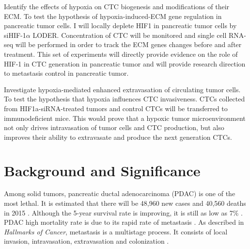 \documentclass[11pts]{article}
\begin{document}
Identify the effects of hypoxia on CTC biogenesis and modifications of their ECM. 
\newline
{} To test the hypothesis of hypoxia-induced-ECM gene regulation in pancreatic tumor cells. 
\newline
{} I will locally deplete HIF1 in pancreatic tumor cells by siHIF-1$\alpha$ LODER. Concentration of CTC will be monitored and single cell RNA-seq will be performed in order to track the ECM genes changes before and after treatment. 
\newline
{} This set of experiments will directly provide evidence on the role of HIF-1 in CTC generation in pancreatic tumor and will provide research direction to metastasis control in pancreatic tumor. 
\newline

Investigate hypoxia-mediated enhanced extravasation of circulating tumor cells.
\newline
{} To test the hypothesis that hypoxia influences CTC invasiveness.
\newline
{} CTCs collected from HIF1a-siRNA-treated tumors and control CTCs will be transferred to immunodeficient mice.
\newline
{} This would prove that a hypoxic tumor microenvironment not only drives intravasation of tumor cells and CTC production, but also improves their ability to extravasate and produce the next generation CTCs.
\bigskip

\section{Background and Significance}
\newline
\noindent Among solid tumors, pancreatic ductal adenocarcinoma (PDAC) is one of the most lethal. It is estimated that there will be 48,960 new cases and 40,560 deaths in 2015 \cite{CAAC:CAAC21254}. Although the 5-year survival rate is improving, it is still as low as 7\% \cite{CAAC:CAAC21254}. PDAC high mortality rate is due to its rapid rate of metastasis \cite{Ting:zl,23718921}. As described in {\it Hallmarks of Cancer}, metastasis is a multistage process. It consists of local invasion, intravasation, extravasation and colonization \cite{Hanahan2011646}.
\newline
\end{document}
